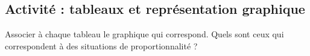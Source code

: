 
\subsection*{Activité : tableaux et représentation graphique}

Associer à chaque tableau le graphique qui correspond. Quels sont ceux qui correspondent à des situations de proportionnalité ?

\begin{equation}
    \quad
    
\end{equation}
\begin{equation}
    \quad
    
\end{equation}

\begin{center}
   
   
   
   
\end{center}
